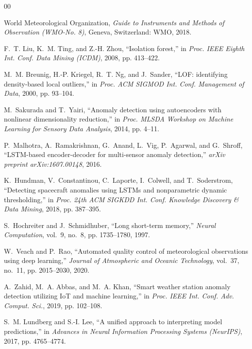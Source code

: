 \documentclass[conference]{IEEEtran}
\begin{document}

\begin{thebibliography}{00}

World Meteorological Organization, \emph{Guide to Instruments and Methods of Observation (WMO-No. 8)}, Geneva, Switzerland: WMO, 2018.

F.~T. Liu, K.~M. Ting, and Z.-H. Zhou, ``Isolation forest,'' in \emph{Proc. IEEE Eighth Int. Conf. Data Mining (ICDM)}, 2008, pp. 413--422.

M.~M. Breunig, H.-P. Kriegel, R.~T. Ng, and J.~Sander, ``LOF: identifying density-based local outliers,'' in \emph{Proc. ACM SIGMOD Int. Conf. Management of Data}, 2000, pp. 93--104.

M.~Sakurada and T.~Yairi, ``Anomaly detection using autoencoders with nonlinear dimensionality reduction,'' in \emph{Proc. MLSDA Workshop on Machine Learning for Sensory Data Analysis}, 2014, pp. 4--11.

P.~Malhotra, A.~Ramakrishnan, G.~Anand, L.~Vig, P.~Agarwal, and G.~Shroff, ``LSTM-based encoder-decoder for multi-sensor anomaly detection,'' \emph{arXiv preprint arXiv:1607.00148}, 2016.

K.~Hundman, V.~Constantinou, C.~Laporte, I.~Colwell, and T.~Soderstrom, ``Detecting spacecraft anomalies using LSTMs and nonparametric dynamic thresholding,'' in \emph{Proc. 24th ACM SIGKDD Int. Conf. Knowledge Discovery \& Data Mining}, 2018, pp. 387--395.

S.~Hochreiter and J.~Schmidhuber, ``Long short-term memory,'' \emph{Neural Computation}, vol.~9, no.~8, pp. 1735--1780, 1997.

W.~Veach and P.~Rao, ``Automated quality control of meteorological observations using deep learning,'' \emph{Journal of Atmospheric and Oceanic Technology}, vol.~37, no.~11, pp. 2015--2030, 2020.

A.~Zahid, M.~A. Abbas, and M.~A. Khan, ``Smart weather station anomaly detection utilizing IoT and machine learning,'' in \emph{Proc. IEEE Int. Conf. Adv. Comput. Sci.}, 2019, pp. 102--108.

S.~M. Lundberg and S.-I. Lee, ``A unified approach to interpreting model predictions,'' in \emph{Advances in Neural Information Processing Systems (NeurIPS)}, 2017, pp. 4765--4774.

\end{thebibliography}
\end{document}
